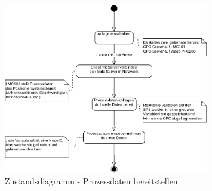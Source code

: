 \documentclass[../../../Bachelorarbeit.tex]{subfiles}
\begin{document}
\begin{figure}[H]
    \centering
    \includegraphics[width=0.8\textwidth]{Images/prozdata_zustand.pdf}
    \caption[Zustandsdiagramm Prozessdaten]{Zustandsdiagramm - Prozessdaten bereitstellen}
    \label{fig:my-img7}
\end{figure}
\end{document}
